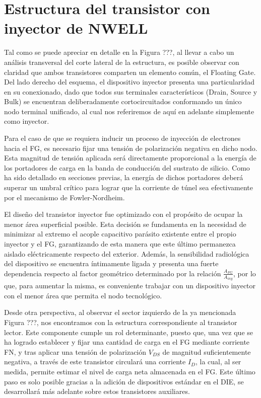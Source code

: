 \documentclass[12pt,a4paper,oneside]{book}
\begin{document}
\section{Estructura del transistor con inyector de NWELL}
Tal como se puede apreciar en detalle en la Figura ???, al llevar a cabo un análisis transversal del corte lateral de la estructura, es posible observar con claridad que ambos transistores comparten un elemento común, el Floating Gate. Del lado derecho del esquema, el dispositivo inyector presenta una particularidad en su conexionado, dado que todos sus terminales característicos (Drain, Source y Bulk) se encuentran deliberadamente cortocircuitados conformando un único nodo terminal unificado, al cual nos referiremos de aquí en adelante simplemente como inyector. 

Para el caso de que se requiera inducir un proceso de inyección de electrones hacia el FG, es necesario fijar una tensión de polarización negativa en dicho nodo. Esta magnitud de tensión aplicada será directamente proporcional a la energía de los portadores de carga en la banda de conducción del sustrato de silicio. Como ha sido detallado en secciones previas, la energía de dichos portadores deberá superar un umbral crítico para lograr que la corriente de túnel sea efectivamente por el mecanismo de Fowler-Nordheim.

El diseño del transistor inyector fue optimizado con el propósito de ocupar la menor área superficial posible. Esta decisión se fundamenta en la necesidad de minimizar al extremo el acople capacitivo parásito existente entre el propio inyector y el FG, garantizando de esta manera que este último permanezca aislado eléctricamente respecto del exterior. Además, la sensibilidad radiológica del dispositivo se encuentra íntimamente ligada y presenta una fuerte dependencia respecto al factor geométrico determinado por la relación $\frac{A_{FG}}{A_{iny}}$, por lo que, para aumentar la misma, es conveniente trabajar con un dispositivo inyector con el menor área que permita el nodo tecnológico.

Desde otra perspectiva, al observar el sector izquierdo de la ya mencionada Figura ???, nos encontramos con la estructura correspondiente al transistor lector. Este componente cumple un rol determinante, puesto que, una vez que se ha logrado establecer y fijar una cantidad de carga en el FG mediante corriente FN, y tras aplicar una tensión de polarización $V_{DS}$ de magnitud suficientemente negativa, a través de este transistor circulará una corriente $I_D$, la cual, al ser medida, permite estimar el nivel de carga neta almacenada en el FG. Este último paso es solo posible gracias a la adición de dispositivos estándar en el DIE, se desarrollará más adelante sobre estos transistores auxiliares.
\end{document}
